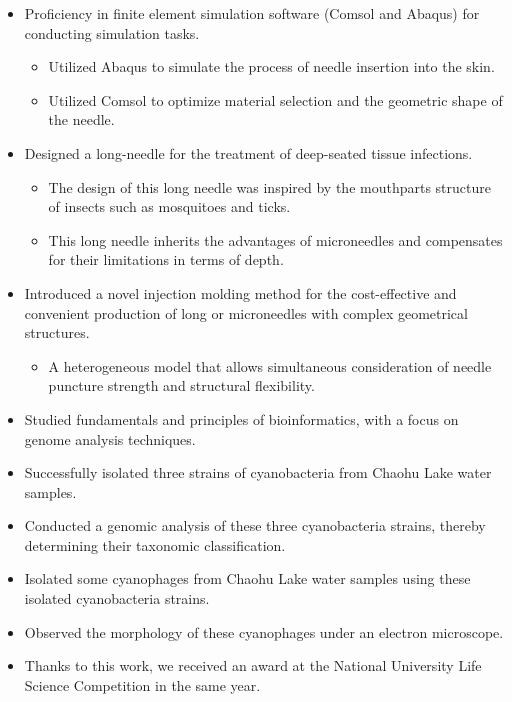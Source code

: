 \documentclass{resume}
\begin{document}

\begin{itemize}
  \item Proficiency in finite element simulation software (Comsol and Abaqus) for conducting simulation tasks.  \begin{itemize}
    \item Utilized Abaqus to simulate the process of needle insertion into the skin.
    \item Utilized Comsol to optimize material selection and the geometric shape of the needle.
  \end{itemize}
  \item Designed a long-needle for the treatment of deep-seated tissue infections.  \begin{itemize}
    \item The design of this long needle was inspired by the mouthparts structure of insects such as mosquitoes and ticks.
    \item This long needle inherits the advantages of microneedles and compensates for their limitations in terms of depth.
  \end{itemize}
  \item Introduced a novel injection molding method for the cost-effective and convenient production of long or microneedles with complex geometrical structures. \begin{itemize}
    \item A heterogeneous model that allows simultaneous consideration of needle puncture strength and structural flexibility.
  \end{itemize}
\end{itemize}


\begin{itemize}
  \item Studied fundamentals and principles of bioinformatics, with a focus on genome analysis techniques.
  \item Successfully isolated three strains of cyanobacteria from Chaohu Lake water samples.
  \item Conducted a genomic analysis of these three cyanobacteria strains, thereby determining their taxonomic classification.
  \item Isolated some cyanophages from Chaohu Lake water samples using these isolated cyanobacteria strains.
  \item Observed the morphology of these cyanophages under an electron microscope.
  \item Thanks to this work, we received an award at the National University Life Science Competition in the same year.
  
\end{itemize}
\end{document}
